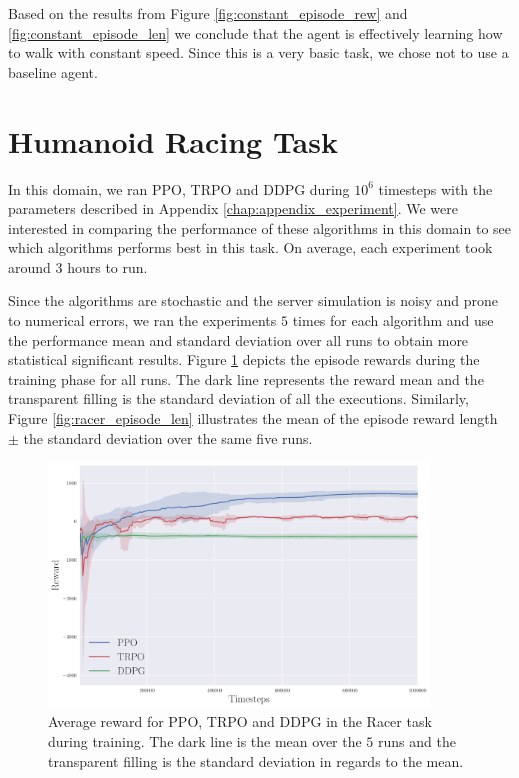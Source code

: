 Based on the results from Figure \ref{fig:constant_episode_rew} and \ref{fig:constant_episode_len}
we conclude that the agent is effectively learning how to walk with constant speed.
Since this is a very basic task, we chose not to use a baseline agent.

\section{Humanoid Racing Task}

In this domain, we ran PPO, TRPO and DDPG during $10^6$ timesteps with the parameters described in Appendix
\ref{chap:appendix_experiment}. We were interested in comparing the performance of these algorithms in this domain
to see which algorithms performs best in this task.
On average, each experiment took around $3$ hours to run.

Since the algorithms are stochastic and the server simulation is noisy and prone to numerical errors, 
we ran the experiments $5$ times for each algorithm and use the performance mean and standard deviation over all runs
to obtain more statistical significant results.
Figure \ref{fig:racer_episode_rew} depicts the episode rewards during the training phase for all runs. 
The dark line represents the reward mean and the transparent filling is the standard deviation
of all the executions.
Similarly, Figure \ref{fig:racer_episode_len} illustrates the mean of the episode reward length $\pm$ the standard deviation
over the same five runs.
\begin{figure}[ht]
	\centering
	\includegraphics[width=0.9\textwidth]{Chapter7/reward.pdf}
	\caption{Average reward for PPO, TRPO and DDPG in the Racer task during training.
	The dark line is the mean over the $5$ runs and the transparent filling is
	 the standard deviation in regards to the mean.}
	\label{fig:racer_episode_rew}
\end{figure}

